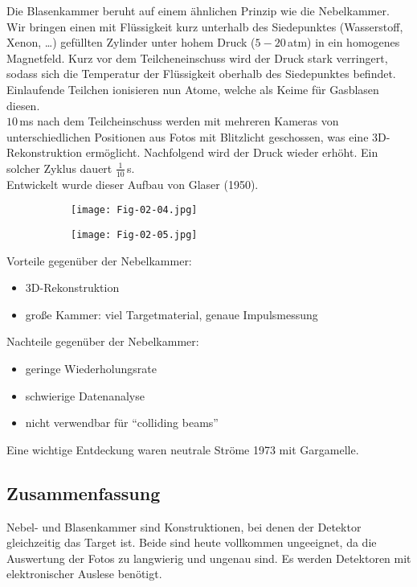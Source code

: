 Die Blasenkammer beruht auf einem ähnlichen Prinzip wie die Nebelkammer. Wir bringen einen mit
Flüssigkeit kurz unterhalb des Siedepunktes (Wasserstoff, Xenon, \ldots) gefüllten Zylinder unter
hohem Druck ($5-20\,$atm) in ein homogenes Magnetfeld. Kurz vor dem Teilcheneinschuss wird der Druck
stark verringert, sodass sich die Temperatur der Flüssigkeit oberhalb des Siedepunktes befindet.
Einlaufende Teilchen ionisieren nun Atome, welche als Keime für Gasblasen diesen.
\\
$10\,$ms nach dem Teilcheinschuss werden mit mehreren Kameras von unterschiedlichen Positionen aus
Fotos mit Blitzlicht geschossen, was eine 3D-Rekonstruktion ermöglicht. Nachfolgend wird der Druck
wieder erhöht.
Ein solcher Zyklus dauert $\frac{1}{10}\,$s. 
\\
Entwickelt wurde dieser Aufbau von Glaser (1950).

\begin{figure}[htbp]
	\begin{minipage}[b]{0.5\textwidth}
		\begin{figure}[H]
		\centering
		\texttt{[image: Fig-02-04.jpg]}
		\end{figure}
	\end{minipage}
	\hfill
	\begin{minipage}[b]{0.5\textwidth}
		\begin{figure}[H]
		\centering
		\texttt{[image: Fig-02-05.jpg]}
		\end{figure}
	\end{minipage}
\end{figure}

Vorteile gegenüber der Nebelkammer:

\begin{itemize}
  \item 3D-Rekonstruktion
  \item große Kammer: viel Targetmaterial, genaue Impulsmessung
\end{itemize}

Nachteile gegenüber der Nebelkammer:

\begin{itemize}
  \item geringe Wiederholungsrate
  \item schwierige Datenanalyse
  \item nicht verwendbar für "`colliding beams"'
\end{itemize}

Eine wichtige Entdeckung waren neutrale Ströme 1973 mit Gargamelle. 

\subsection*{Zusammenfassung}

Nebel- und Blasenkammer sind Konstruktionen, bei denen der Detektor gleichzeitig das Target ist.
Beide sind heute vollkommen ungeeignet, da die Auswertung der Fotos zu langwierig und ungenau sind.
Es werden Detektoren mit elektronischer Auslese benötigt.
